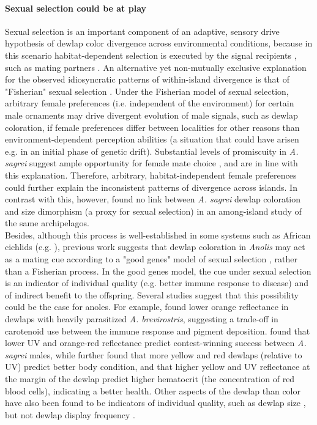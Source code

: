 \paragraph{Sexual selection could be at play} Sexual selection is an important component of an adaptive, sensory drive hypothesis of dewlap color divergence across environmental conditions, because in this scenario habitat-dependent selection is executed by the signal recipients \citep{Endler1988}, such as mating partners \citep{Driessens2014}. An alternative yet non-mutually exclusive explanation for the observed idiosyncratic patterns of within-island divergence is that of "Fisherian" sexual selection \citep{Andersson1994}. Under the Fisherian model of sexual selection, arbitrary female preferences (i.e. independent of the environment) for certain male ornaments may drive divergent evolution of male signals, such as dewlap coloration, if female preferences differ between localities for other reasons than environment-dependent perception abilities (a situation that could have arisen e.g. in an initial phase of genetic drift). Substantial levels of promiscuity in \textit{A. sagrei} suggest ample opportunity for female mate choice \citep{Kamath2018}, and are in line with this explanation. Therefore, arbitrary, habitat-independent female preferences could further explain the inconsistent patterns of divergence across islands. In contrast with this, however, \citet{Baeckens2018} found no link between \textit{A. sagrei} dewlap coloration and size dimorphism (a proxy for sexual selection) in an among-island study of the same archipelagos.\\

Besides, although this process is well-established in some systems such as African cichlids (e.g. \citealt{Seehausen1997}), previous work suggests that dewlap coloration in \textit{Anolis} may act as a mating cue according to a "good genes" model of sexual selection \citep{Andersson1994}, rather than a Fisherian process. In the good genes model, the cue under sexual selection is an indicator of individual quality (e.g. better immune response to disease) and of indirect benefit to the offspring. Several studies suggest that this possibility could be the case for anoles. For example, \citet{Cook2013} found lower orange reflectance in dewlaps with heavily parasitized \textit{A. brevirostris}, suggesting a trade-off in carotenoid use between the immune response and pigment deposition. \citet{Steffen2014} found that lower UV and orange-red reflectance predict contest-winning success between \textit{A. sagrei} males, while \citet{Driessens2015} further found that more yellow and red dewlaps (relative to UV) predict better body condition, and that higher yellow and UV reflectance at the margin of the dewlap predict higher hematocrit (the concentration of red blood cells), indicating a better health. Other aspects of the dewlap than color have also been found to be indicators of individual quality, such as dewlap size \citep{Vanhooydonck2005, Vanhooydonck2009}, but not dewlap display frequency \citep{Tokarz2002, Tokarz2005, Driessens2015}.\\

